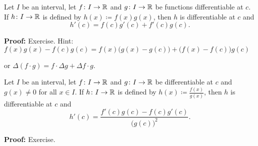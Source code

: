 \documentclass[10pt,aspectratio=149]{beamer}
\begin{document}
\begin{frame}

\begin{proposition}
Let $I$ be an interval, let
$f \colon I \to {\mathbb{R}}$ and $g \colon I \to {\mathbb{R}}$ be 
functions differentiable at $c$.  If $h \colon I \to {\mathbb{R}}$
is defined by
$h(x) \coloneqq f(x) g(x)$,
\pause
then $h$ is differentiable at $c$ and
\begin{equation*}
h'(c) = f(c) g'(c) + f'(c) g(c) .
\end{equation*}
\end{proposition}

\pause

\textbf{Proof:} Exercise.
\pause
Hint: 
$f(x) g(x) - f(c) g(c) =
f(x)\bigl( g(x) - g(c) \bigr)
+ \bigl( f(x) - f(c) \bigr) g(c)$

\pause

or \qquad
$\Delta (f \cdot g) = f \cdot \Delta g + \Delta f \cdot g$.

\pause
\begin{center}
\end{center}

\end{frame}

\begin{frame}

\begin{proposition}
Let $I$ be an interval, let
$f \colon I \to {\mathbb{R}}$ and $g \colon I \to {\mathbb{R}}$ be differentiable at $c$
and $g(x) \not= 0$ for all $x \in I$.
If $h \colon I \to {\mathbb{R}}$
is defined by
$h(x) \coloneqq \frac{f(x)}{g(x)}$,
\pause
then $h$ is differentiable at $c$ and
\begin{equation*}
h'(c) = \frac{f'(c) g(c) - f(c) g'(c)}{{\bigl(g(c)\bigr)}^2} .
\end{equation*}
\end{proposition}

\pause

\textbf{Proof:}  Exercise.

\end{frame}
\end{document}
